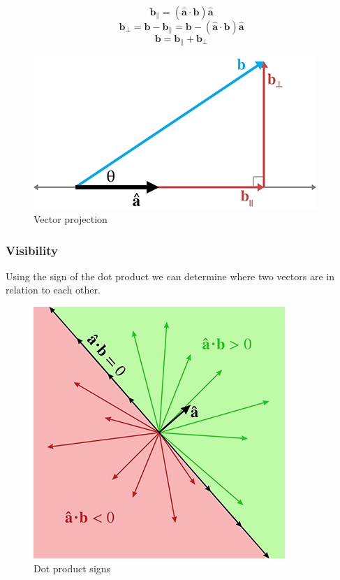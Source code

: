 \documentclass[a4paper,11pt]{article}
\begin{document}
$$\textbf{b}_\|=(\hat{\textbf{a}}\cdot\textbf{b})\hat{\textbf{a}}$$
$$\textbf{b}_\perp=\textbf{b}-\textbf{b}_\|=\textbf{b}-(\hat{\textbf{a}}\cdot\textbf{b})\hat{\textbf{a}}$$
$$\textbf{b}=\textbf{b}_\|+\textbf{b}_\perp$$

\begin{figure}[H]
\centering
    \includegraphics{02_vector_projection}
\caption{Vector projection}
\label{fig:vector-projection}
\end{figure}

\subsubsection{Visibility}

Using the sign of the dot product we can determine where two vectors are in relation to each other.

\begin{figure}[H]
\centering
    \includegraphics{02_dot_signs}
\caption{Dot product signs}
\label{fig:dot-product-signs}
\end{figure}
\end{document}
